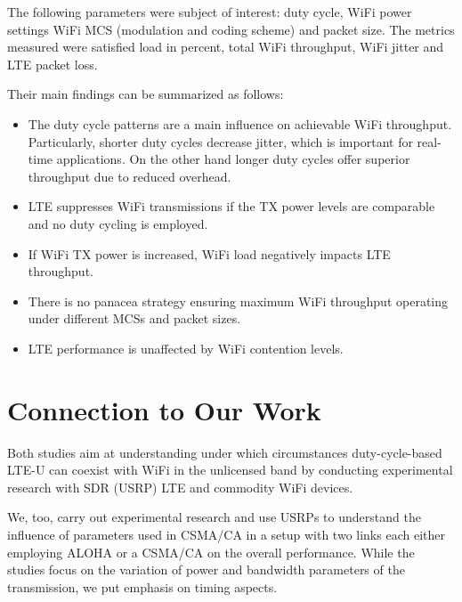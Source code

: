 The following parameters were subject of interest: duty cycle, WiFi power settings WiFi MCS (modulation and coding scheme) and packet size. The metrics measured were satisfied load in percent, total WiFi throughput, WiFi jitter and LTE packet loss.  

Their main findings can be summarized as follows:

\begin{itemize}
	\item The duty cycle patterns are a main influence on achievable WiFi throughput. Particularly, shorter duty cycles decrease jitter, which is important for real-time applications. On the other hand longer duty cycles offer superior throughput due to reduced overhead.
	\item LTE suppresses WiFi transmissions if the TX power levels are comparable and no duty cycling is employed.
	\item If WiFi TX power is increased, WiFi load negatively impacts LTE throughput.
	\item There is no panacea strategy ensuring maximum WiFi throughput operating under different MCSs and packet sizes.
	\item LTE performance is unaffected by WiFi contention levels.
\end{itemize}

\section{Connection to Our Work}

Both studies aim at understanding under which circumstances duty-cycle-based LTE-U can coexist with WiFi in the unlicensed band by conducting experimental research with SDR (USRP) LTE and commodity WiFi devices. 

We, too, carry out experimental research and use USRPs to understand the influence of parameters used in CSMA/CA in a setup with two links each either employing ALOHA or a CSMA/CA on the overall performance. While the studies focus on the variation of power and bandwidth parameters of the transmission, we put emphasis on timing aspects.   
